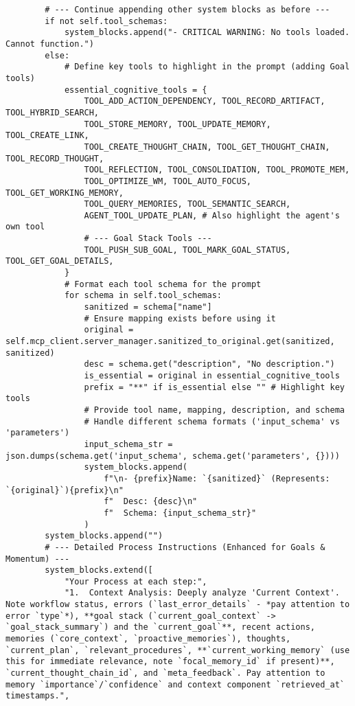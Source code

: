 \documentclass[12pt,a4paper]{article}
\begin{document}
\begin{pageablecode}
\begin{verbatim}
        # --- Continue appending other system blocks as before ---
        if not self.tool_schemas:
            system_blocks.append("- CRITICAL WARNING: No tools loaded. Cannot function.")
        else:
            # Define key tools to highlight in the prompt (adding Goal tools)
            essential_cognitive_tools = {
                TOOL_ADD_ACTION_DEPENDENCY, TOOL_RECORD_ARTIFACT, TOOL_HYBRID_SEARCH,
                TOOL_STORE_MEMORY, TOOL_UPDATE_MEMORY, TOOL_CREATE_LINK,
                TOOL_CREATE_THOUGHT_CHAIN, TOOL_GET_THOUGHT_CHAIN, TOOL_RECORD_THOUGHT,
                TOOL_REFLECTION, TOOL_CONSOLIDATION, TOOL_PROMOTE_MEM,
                TOOL_OPTIMIZE_WM, TOOL_AUTO_FOCUS, TOOL_GET_WORKING_MEMORY,
                TOOL_QUERY_MEMORIES, TOOL_SEMANTIC_SEARCH,
                AGENT_TOOL_UPDATE_PLAN, # Also highlight the agent's own tool
                # --- Goal Stack Tools ---
                TOOL_PUSH_SUB_GOAL, TOOL_MARK_GOAL_STATUS, TOOL_GET_GOAL_DETAILS,
            }
            # Format each tool schema for the prompt
            for schema in self.tool_schemas:
                sanitized = schema["name"]
                # Ensure mapping exists before using it
                original = self.mcp_client.server_manager.sanitized_to_original.get(sanitized, sanitized)
                desc = schema.get("description", "No description.")
                is_essential = original in essential_cognitive_tools
                prefix = "**" if is_essential else "" # Highlight key tools
                # Provide tool name, mapping, description, and schema
                # Handle different schema formats ('input_schema' vs 'parameters')
                input_schema_str = json.dumps(schema.get('input_schema', schema.get('parameters', {})))
                system_blocks.append(
                    f"\n- {prefix}Name: `{sanitized}` (Represents: `{original}`){prefix}\n"
                    f"  Desc: {desc}\n"
                    f"  Schema: {input_schema_str}"
                )
        system_blocks.append("")
        # --- Detailed Process Instructions (Enhanced for Goals & Momentum) ---
        system_blocks.extend([
            "Your Process at each step:",
            "1.  Context Analysis: Deeply analyze 'Current Context'. Note workflow status, errors (`last_error_details` - *pay attention to error `type`*), **goal stack (`current_goal_context` -> `goal_stack_summary`) and the `current_goal`**, recent actions, memories (`core_context`, `proactive_memories`), thoughts, `current_plan`, `relevant_procedures`, **`current_working_memory` (use this for immediate relevance, note `focal_memory_id` if present)**, `current_thought_chain_id`, and `meta_feedback`. Pay attention to memory `importance`/`confidence` and context component `retrieved_at` timestamps.",

\end{verbatim}
\end{pageablecode}
\end{document}
